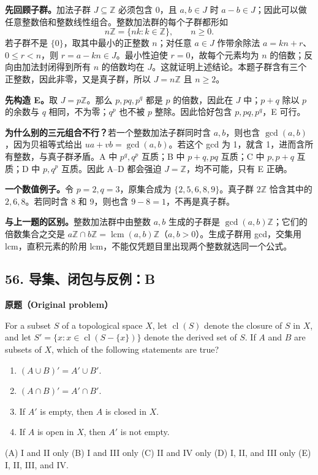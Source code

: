 \documentclass[11pt,a4paper,fontset=fandol]{ctexart}
\begin{document}
\textbf{先回顾子群。}加法子群 $J\subseteq\mathbb Z$ 必须包含 0，且 $a,b\in J$ 时 $a-b\in J$；因此可以做任意整数倍和整数线性组合。整数加法群的每个子群都形如
\[
n\mathbb Z=\{nk:k\in\mathbb Z\},\qquad n\ge0.
\]
若子群不是 $\{0\}$，取其中最小的正整数 $n$；对任意 $a\in J$ 作带余除法 $a=kn+r$、$0\le r<n$，则 $r=a-kn\in J$。最小性迫使 $r=0$，故每个元素均为 $n$ 的倍数；反向由加法封闭得到所有 $n$ 的倍数均在 $J$。这就证明上述结论。本题子群含有三个正整数，因此非零，又是真子群，所以 $J=n\mathbb Z$ 且 $n\ge2$。

\textbf{先构造 E。}取 $J=p\mathbb Z$。那么 $p,pq,p^q$ 都是 $p$ 的倍数，因此在 $J$ 中；$p+q$ 除以 $p$ 的余数与 $q$ 相同，不为零；$q^p$ 也不被 $p$ 整除。因此恰好包含 $p,pq,p^q$，E 可行。

\textbf{为什么别的三元组合不行？}若一个整数加法子群同时含 $a,b$，则也含 $\gcd(a,b)$，因为贝祖等式给出 $ua+vb=\gcd(a,b)$。若这个 gcd 为 1，就含 1，进而含所有整数，与真子群矛盾。A 中 $p^q,q^p$ 互质；B 中 $p+q,pq$ 互质；C 中 $p,p+q$ 互质；D 中 $p,q^p$ 互质。因此 A--D 都会强迫 $J=\mathbb Z$，均不可能，只有 E 正确。

\textbf{一个数值例子。}令 $p=2,q=3$，原集合成为 $\{2,5,6,8,9\}$。真子群 $2\mathbb Z$ 恰含其中的 $2,6,8$。若同时含 8 和 9，则也含 $9-8=1$，不再是真子群。

\textbf{与上一题的区别。}整数加法群中由整数 $a,b$ 生成的子群是 $\gcd(a,b)\mathbb Z$；它们的倍数集合之交是 $a\mathbb Z\cap b\mathbb Z=\operatorname{lcm}(a,b)\mathbb Z$（$a,b>0$）。生成子群用 gcd，交集用 lcm，直积元素的阶用 lcm，不能仅凭题目里出现两个整数就选同一个公式。

\subsection{56. 导集、闭包与反例：B}
\label{p3:q56}
\textbf{原题（Original problem）}

For a subset $S$ of a topological space $X$, let $\operatorname{cl}(S)$ denote the closure of $S$ in $X$, and let $S'=\{x:x\in\operatorname{cl}(S-\{x\})\}$ denote the derived set of $S$. If $A$ and $B$ are subsets of $X$, which of the following statements are true?
\begin{enumerate}[label=\Roman*.]
\item $(A\cup B)'=A'\cup B'$.
\item $(A\cap B)'=A'\cap B'$.
\item If $A'$ is empty, then $A$ is closed in $X$.
\item If $A$ is open in $X$, then $A'$ is not empty.
\end{enumerate}
(A) I and II only \quad (B) I and III only \quad (C) II and IV only \quad (D) I, II, and III only \quad (E) I, II, III, and IV.
\end{document}
